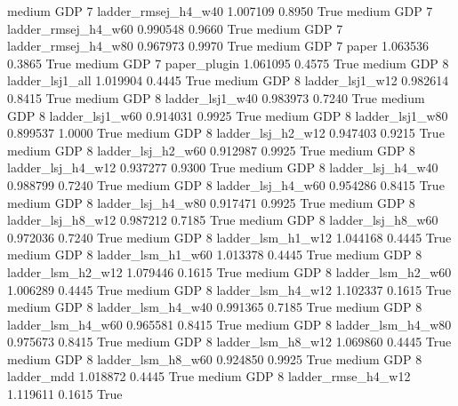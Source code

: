     medium      GDP                 7 ladder_rmsej_h4_w40   1.007109      0.8950    True
    medium      GDP                 7 ladder_rmsej_h4_w60   0.990548      0.9660    True
    medium      GDP                 7 ladder_rmsej_h4_w80   0.967973      0.9970    True
    medium      GDP                 7               paper   1.063536      0.3865    True
    medium      GDP                 7        paper_plugin   1.061095      0.4575    True
    medium      GDP                 8     ladder_lsj1_all   1.019904      0.4445    True
    medium      GDP                 8     ladder_lsj1_w12   0.982614      0.8415    True
    medium      GDP                 8     ladder_lsj1_w40   0.983973      0.7240    True
    medium      GDP                 8     ladder_lsj1_w60   0.914031      0.9925    True
    medium      GDP                 8     ladder_lsj1_w80   0.899537      1.0000    True
    medium      GDP                 8   ladder_lsj_h2_w12   0.947403      0.9215    True
    medium      GDP                 8   ladder_lsj_h2_w60   0.912987      0.9925    True
    medium      GDP                 8   ladder_lsj_h4_w12   0.937277      0.9300    True
    medium      GDP                 8   ladder_lsj_h4_w40   0.988799      0.7240    True
    medium      GDP                 8   ladder_lsj_h4_w60   0.954286      0.8415    True
    medium      GDP                 8   ladder_lsj_h4_w80   0.917471      0.9925    True
    medium      GDP                 8   ladder_lsj_h8_w12   0.987212      0.7185    True
    medium      GDP                 8   ladder_lsj_h8_w60   0.972036      0.7240    True
    medium      GDP                 8   ladder_lsm_h1_w12   1.044168      0.4445    True
    medium      GDP                 8   ladder_lsm_h1_w60   1.013378      0.4445    True
    medium      GDP                 8   ladder_lsm_h2_w12   1.079446      0.1615    True
    medium      GDP                 8   ladder_lsm_h2_w60   1.006289      0.4445    True
    medium      GDP                 8   ladder_lsm_h4_w12   1.102337      0.1615    True
    medium      GDP                 8   ladder_lsm_h4_w40   0.991365      0.7185    True
    medium      GDP                 8   ladder_lsm_h4_w60   0.965581      0.8415    True
    medium      GDP                 8   ladder_lsm_h4_w80   0.975673      0.8415    True
    medium      GDP                 8   ladder_lsm_h8_w12   1.069860      0.4445    True
    medium      GDP                 8   ladder_lsm_h8_w60   0.924850      0.9925    True
    medium      GDP                 8          ladder_mdd   1.018872      0.4445    True
    medium      GDP                 8  ladder_rmse_h4_w12   1.119611      0.1615    True
